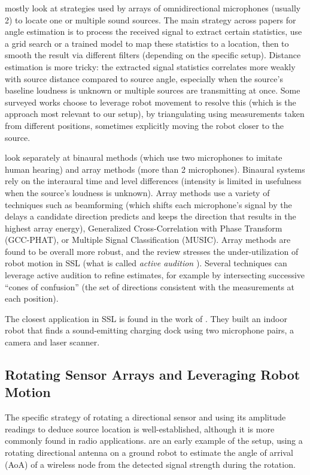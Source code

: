 \documentclass[journal,a4paper]{IEEEtran}
\begin{document}
\citet{rascon2017review} mostly look at strategies used by arrays of omnidirectional microphones (usually 2) to locate one or multiple sound sources. The main strategy across papers for angle estimation is to process the received signal to extract certain statistics, use a grid search or a trained model to map these statistics to a location, then to smooth the result via different filters (depending on the specific setup). Distance estimation is more tricky: the extracted signal statistics correlates more weakly with source distance compared to source angle, especially when the source's baseline loudness is unknown or multiple sources are transmitting at once. Some surveyed works choose to leverage robot movement to resolve this (which is the approach most relevant to our setup), by triangulating using measurements taken from different positions, sometimes explicitly moving the robot closer to the source. 

\citet{argentieri2015survey} look separately at binaural methods (which use two
microphones to imitate human hearing) and array methods (more than 2 microphones). Binaural
systems rely on the interaural time and level differences (intensity is limited in usefulness when the source's loudness is unknown). Array methods use a variety of techniques such as beamforming (which shifts each microphone’s signal by the delays a candidate direction predicts and keeps the direction that results in the highest array energy), Generalized Cross-Correlation with Phase Transform (GCC-PHAT), or Multiple Signal Classification (MUSIC).
Array methods are found to be overall more robust, and the review stresses the under-utilization of robot motion in SSL (what is called \emph{active audition} \cite{nakadai2000active}). Several techniques can leverage active audition to refine estimates, for example by intersecting successive ``cones of confusion'' (the set of directions consistent with the measurements at each position).

The closest application in SSL is found in the work of
\citet{luo2010docking}. They built an indoor robot that finds a sound-emitting charging dock using two microphone pairs, a camera and laser scanner.

\subsection{Rotating Sensor Arrays and Leveraging Robot Motion}

The specific strategy of rotating a directional sensor and using its amplitude readings to deduce source location is well-established, although it is more commonly found in radio applications. \citet{graefenstein2009wireless} are an early example of the setup, using a rotating directional antenna on a ground robot to estimate the angle of arrival (AoA) of a wireless node from the detected signal strength during the rotation.
\end{document}
